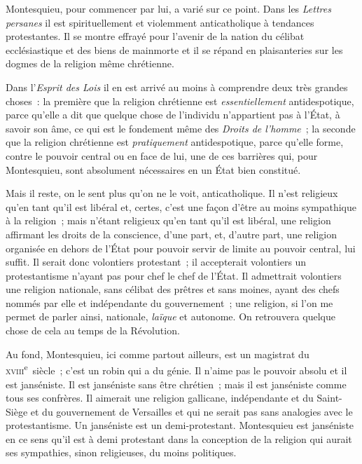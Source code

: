 \documentclass[french,twoside]{book} %
\begin{document}
Montesquieu, pour commencer par lui, a varié sur ce point. Dans les \emph{Lettres persanes} il est spirituellement et violemment anticatholique à tendances protestantes. Il se montre effrayé pour l’avenir de la nation du célibat ecclésiastique et des biens de mainmorte et il se répand en plaisanteries sur les dogmes de la religion même chrétienne.\par
 Dans l’\emph{Esprit des Lois} il en est arrivé au moins à comprendre deux très grandes choses : la première que la religion chrétienne est {\itshape essentiellement} antidespotique, parce qu’elle a dit que quelque chose de l’individu n’appartient pas à l’État, à savoir son âme, ce qui est le fondement même des \emph{Droits de l’homme} ; la seconde que la religion chrétienne est {\itshape pratiquement} antidespotique, parce qu’elle forme, contre le pouvoir central ou en face de lui, une de ces barrières qui, pour Montesquieu, sont absolument nécessaires en un État bien constitué.\par
Mais il reste, on le sent plus qu’on ne le voit, anticatholique. Il n’est religieux qu’en tant qu’il est libéral et, certes, c’est une façon d’être au moins sympathique à la religion ; mais n’étant religieux qu’en tant qu’il est libéral, une religion affirmant les droits de la conscience, d’une part, et, d’autre part, une religion organisée en dehors de l’État pour pouvoir servir de limite au pouvoir central, lui suffit. Il serait donc volontiers protestant ; il accepterait volontiers un protestantisme n’ayant pas pour chef le chef de l’État. Il admettrait volontiers une religion nationale, sans célibat des prêtres et sans moines, ayant des chefs nommés par elle et indépendante du gouvernement ; une religion, si l’on me permet de parler ainsi, nationale,  {\itshape laïque} et autonome. On retrouvera quelque chose de cela au temps de la Révolution.\par
Au fond, Montesquieu, ici comme partout ailleurs, est un magistrat du \textsc{xviii}\textsuperscript{e} siècle ; c’est un robin qui a du génie. Il n’aime pas le pouvoir absolu et il est janséniste. Il est janséniste sans être chrétien ; mais il est janséniste comme tous ses confrères. Il aimerait une religion gallicane, indépendante et du Saint-Siège et du gouvernement de Versailles et qui ne serait pas sans analogies avec le protestantisme. Un janséniste est un demi-protestant. Montesquieu est janséniste en ce sens qu’il est à demi protestant dans la conception de la religion qui aurait ses sympathies, sinon religieuses, du moins politiques.\par
\end{document}
